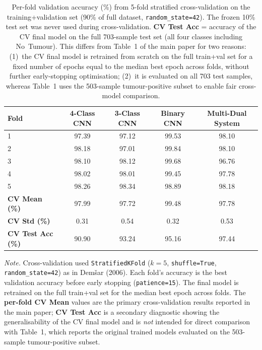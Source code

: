 \documentclass[12pt]{article}
\begin{document}
\begin{table}[ht]
\centering
\caption{Per-fold validation accuracy (\%) from 5-fold stratified cross-validation
  on the training+validation set (90\% of full dataset, \texttt{random\_state=42}).
  The frozen 10\% test set was never used during cross-validation.
  \textbf{CV Test Acc} = accuracy of the CV final model on the full 703-sample
  test set (all four classes including No~Tumour).
  This differs from Table~1 of the main paper for two reasons: (1)~the CV
  final model is retrained from scratch on the full train+val set for a fixed
  number of epochs equal to the median best epoch across folds, without
  further early-stopping optimisation; (2)~it is evaluated on all 703 test
  samples, whereas Table~1 uses the 503-sample tumour-positive subset to
  enable fair cross-model comparison.
}
\label{tab:s3_cv}
\begin{tabular}{lcccc}
\toprule
\textbf{Fold} &
\textbf{4-Class CNN} &
\textbf{3-Class CNN} &
\textbf{Binary CNN} &
\textbf{Multi-Dual System} \\
\midrule
1 & 97.39 & 97.12 & 99.53 & 98.10 \\
2 & 98.18 & 97.01 & 99.84 & 98.10 \\
3 & 98.10 & 98.12 & 99.68 & 96.76 \\
4 & 98.02 & 98.01 & 99.45 & 97.78 \\
5 & 98.26 & 98.34 & 98.89 & 98.18 \\
\midrule
\textbf{CV Mean (\%)}      & 97.99 & 97.72 & 99.48 & 97.78 \\
\textbf{CV Std (\%)}       &  0.31 &  0.54 &  0.32 &  0.53 \\
\midrule
\textbf{CV Test Acc (\%)}  & 90.90 & 93.24 & 95.16 & 97.44 \\
\bottomrule
\end{tabular}
\end{table}

\vspace{1em}
\noindent\textit{Note.} Cross-validation used \texttt{StratifiedKFold}
($k=5$, \texttt{shuffle=True}, \texttt{random\_state=42}) as in Dem\v{s}ar (2006).
Each fold's accuracy is the best validation accuracy before early stopping
(\texttt{patience=15}). The final model is retrained on the full train+val
set for the median best epoch across folds.
The \textbf{per-fold CV Mean} values are the primary cross-validation results
reported in the main paper; \textbf{CV Test Acc} is a secondary diagnostic
showing the generalisability of the CV final model and is \emph{not} intended
for direct comparison with Table~1, which reports the original trained models
evaluated on the 503-sample tumour-positive subset.
\end{document}
